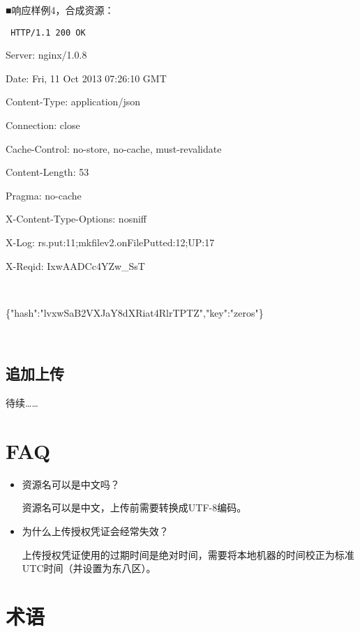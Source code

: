 \documentclass[11pt, oneside]{book}
\newcommand{\qhint}[1]{
\footnotesize
\vspace{0.2em}
\noindent
#1\par
\vspace{-0.5em}
\normalsize
}
\newcommand{\qpara}[1]{
\vspace{0.2em}
\begin{spacing}{1.35}
\noindent
#1\par
\end{spacing}
\vspace{0.2em}
}
\newcommand{\qblock}[1]{
\vspace{0.1em}
\noindent
#1\par
\vspace{0.1em}
}
\newcommand{\qhttp}[1]{\noindent #1\par}
\begin{document}
\qblock{■\thinspace 响应样例4，合成资源：}
{
\tt \footnotesize
\qhttp{HTTP/1.1 200 OK}
\qhttp{Server: nginx/1.0.8}
\qhttp{Date: Fri, 11 Oct 2013 07:26:10 GMT}
\qhttp{Content-Type: application/json}
\qhttp{Connection: close}
\qhttp{Cache-Control: no-store, no-cache, must-revalidate}
\qhttp{Content-Length: 53}
\qhttp{Pragma: no-cache}
\qhttp{X-Content-Type-Options: nosniff}
\qhttp{X-Log: rs.put:11;mkfilev2.onFilePutted:12;UP:17}
\qhttp{X-Reqid: IxwAADCc4YZw\_SsT}
\qhttp{\ }
\qhttp{\{"hash":"lvxwSaB2VXJaY8dXRiat4RlrTPTZ","key":"zeros"\}}
\qhttp{\ }
}

\clearpage

\section{追加上传}

\qpara{待续……}

\chapter{FAQ}

\begin{itemize}
  \item 资源名可以是中文吗？\par
  \qhint{资源名可以是中文，上传前需要转换成UTF-8编码。}

  \item 为什么上传授权凭证会经常失效？\par
  \qhint{上传授权凭证使用的过期时间是绝对时间，需要将本地机器的时间校正为标准UTC时间（并设置为东八区）。}
\end{itemize}

\chapter{术语}
\end{document}
